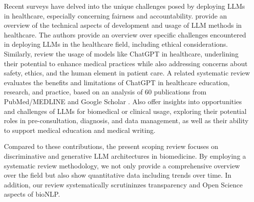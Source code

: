 \documentclass[fleqn,10pt]{olplainarticle}
\begin{document}
Recent surveys have delved into the unique challenges posed by deploying LLMs in healthcare, especially concerning fairness and accountability. \cite{he2023survey} provide an overview of the technical
aspects of development and usage of LLM methods in healthcare. The authors provide an overview over specific challenges encountered in deploying LLMs in the healthcare field, including ethical considerations. Similarly, \cite{thirunavukarasu2023large} review the usage of models like ChatGPT in healthcare, underlining their potential to enhance medical practices while also addressing concerns about safety, ethics, and the human element in patient care. A related systematic review evaluates the benefits and limitations of ChatGPT in healthcare education, research, and practice, based on an analysis of 60 publications from PubMed/MEDLINE and Google Scholar \citep{sallam2023chatgpt}. Also \cite{yang2023large} offer insights into opportunities and challenges of LLMs for biomedical or clinical usage, exploring their potential roles in pre-consultation, diagnosis, and data management, as well as their ability to support medical education and medical writing.

Compared to these contributions, the present scoping review focuses on  discriminative and generative LLM architectures in biomedicine. By employing a systematic review methodology, we not only provide a comprehensive overview over the field but also show quantitative data including trends over time. In addition, our review systematically scrutininzes transparency and Open Science aspects of bioNLP. 



\end{document}
